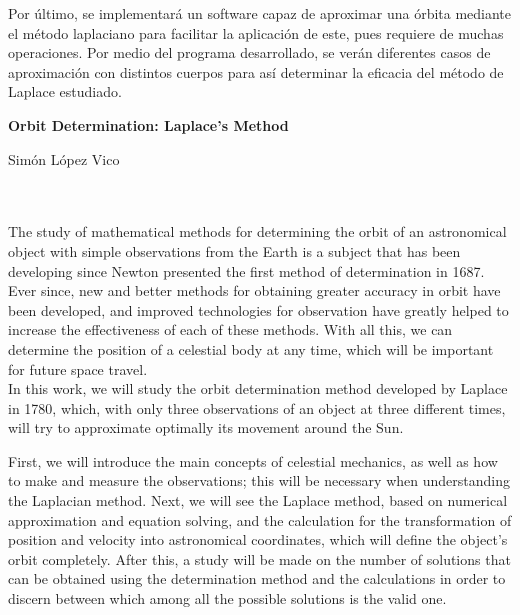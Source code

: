 Por último, se implementará un software capaz de aproximar una órbita mediante el método laplaciano para facilitar la aplicación de este, pues requiere de muchas operaciones. Por medio del programa desarrollado, se verán diferentes casos de aproximación con distintos cuerpos para así determinar la eficacia del método de Laplace estudiado.





\clearpage{\thispagestyle{empty}\cleardoublepage}




\thispagestyle{empty}
\begin{center}
{
	\large\bfseries Orbit Determination: Laplace's Method
}\\
\end{center}

\begin{center}
	Simón López Vico\\
\end{center}

\\

\vspace{0.7cm}
\\

The study of mathematical methods for determining the orbit of an astronomical object with simple observations from the Earth is a subject that has been developing since Newton presented the first method of determination in 1687. Ever since, new and better methods for obtaining greater accuracy in orbit have been developed, and improved technologies for observation have greatly helped to increase the effectiveness of each of these methods. With all this, we can determine the position of a celestial body at any time, which will be important for future space travel.\\

In this work, we will study the orbit determination method developed by Laplace in 1780, which, with only three observations of an object at three different times, will try to approximate optimally its movement around the Sun.

First, we will introduce the main concepts of celestial mechanics, as well as how to make and measure the observations; this will be necessary when understanding the Laplacian method. Next, we will see the Laplace method, based on numerical approximation and equation solving, and the calculation for the transformation of position and velocity into astronomical coordinates, which will define the object's orbit completely. After this, a study will be made on the number of solutions that can be obtained using the determination method and the calculations in order to discern between which among all the possible solutions is the valid one.\\

